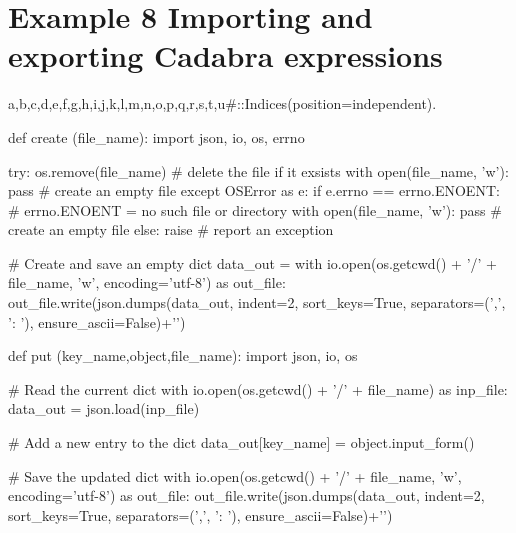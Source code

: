 \documentclass[12pt]{cdblatex}
\begin{document}
%

\section*{Example 8 Importing and exporting Cadabra expressions}

\begin{cadabra}
   {a,b,c,d,e,f,g,h,i,j,k,l,m,n,o,p,q,r,s,t,u#}::Indices(position=independent).

   def create (file_name):
       import json, io, os, errno

       try:
           os.remove(file_name)                # delete the file if it exsists
           with open(file_name, 'w'): pass     # create an empty file
       except OSError as e:
           if e.errno == errno.ENOENT:         # errno.ENOENT = no such file or directory
              with open(file_name, 'w'): pass  # create an empty file
           else:
               raise                           # report an exception

       # Create and save an empty dict
       data_out = {}
       with io.open(os.getcwd() + '/' + file_name, 'w', encoding='utf-8') as out_file:
           out_file.write(json.dumps(data_out,
                                     indent=2,
                                     sort_keys=True,
                                     separators=(',', ': '),
                                     ensure_ascii=False)+'\n')

   def put (key_name,object,file_name):
       import json, io, os

       # Read the current dict
       with io.open(os.getcwd() + '/' + file_name) as inp_file:
           data_out = json.load(inp_file)

       # Add a new entry to the dict
       data_out[key_name] = object.input_form()

       # Save the updated dict
       with io.open(os.getcwd() + '/' + file_name, 'w', encoding='utf-8') as out_file:
           out_file.write(json.dumps(data_out,
                                     indent=2,
                                     sort_keys=True,
                                     separators=(',', ': '),
                                     ensure_ascii=False)+'\n')


\end{cadabra}
\end{document}
